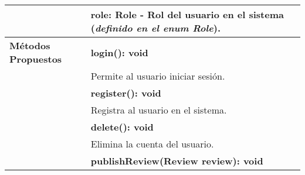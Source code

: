 \begin{clases}
\begin{tabular}{|>{\raggedright\arraybackslash}p{4cm}|p{12cm}|}
		                              & \textbf{role}: Role - Rol del usuario en el sistema (\textit{definido en el enum Role}).                                                                                                                                                                               \\
		\hline
		\textbf{Métodos Propuestos}   & \textbf{login(): void}                                                                                                                                                                                                                                                 \\
		                              & Permite al usuario iniciar sesión.                                                                                                                                                                                                                                     \\
		                              & \textbf{register(): void}                                                                                                                                                                                                                                              \\
		                              & Registra al usuario en el sistema.                                                                                                                                                                                                                                     \\
		                              & \textbf{delete(): void}                                                                                                                                                                                                                                                \\
		                              & Elimina la cuenta del usuario.                                                                                                                                                                                                                                         \\
		                              & \textbf{publishReview(Review review): void}                                                                                                                                                                                                                            \\

\end{tabular}
\end{clases}
